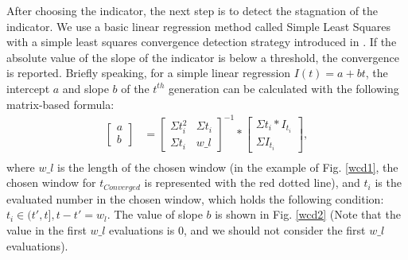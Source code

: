 \documentclass[conference]{IEEEtran}
\begin{document}
After choosing the indicator, the next step is to detect the stagnation of the indicator.
We use a basic linear regression method called Simple Least Squares\cite{SimpleLeastSquares} with a
simple least squares convergence detection strategy introduced in \cite{convergenceDetection:LSSC}.
If the absolute value of the slope of the indicator is below a threshold, the convergence is reported.
Briefly speaking, for a simple linear regression $I(t)=a+bt$, 
the intercept $a$ and slope $b$ of the $t^{th}$ generation can be calculated 
with the following matrix-based formula:
\begin{equation}\begin{aligned}\label{elr1}
  \left[
    \begin{matrix}
      a \\
      b
    \end{matrix}
  \right]
  &= 
  \left[
    \begin{matrix}
      \Sigma t_i^2 & \Sigma t_i \\
      \Sigma t_i   & w\_l 
    \end{matrix}
  \right]^{-1}
  *
  \left[
    \begin{matrix}
      \Sigma t_i * I_{t_i} \\
      \Sigma I_{t_i} 
    \end{matrix}
  \right], \\
\end{aligned}
\end{equation}
where $w\_ l$ is the length of the chosen window
(in the example of Fig. \ref{wcd1}, the chosen window for $t_{Converged}$ is represented with the red dotted line), 
and $t_i$ is the evaluated number in the chosen window, 
which holds the following condition: $t_i \in (t',t], t - t' = w_l$.
The value of slope $b$ is shown in Fig. \ref{wcd2} 
(Note that the value in the first $w\_ l$ evaluations is 0, 
and we should not consider the first $w\_ l$ evaluations). 
\end{document}
